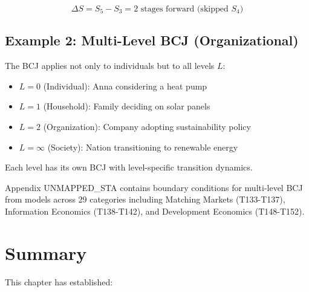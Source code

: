 \begin{equation}
\Delta S = S_5 - S_3 = 2 \text{ stages forward (skipped } S_4\text{)}
\label{eq:anna-transition}
\end{equation}

\subsection{Example 2: Multi-Level BCJ (Organizational)}

\begin{intuition}
The BCJ applies not only to individuals but to all levels $L$:
\begin{itemize}
    \item $L=0$ (Individual): Anna considering a heat pump
    \item $L=1$ (Household): Family deciding on solar panels
    \item $L=2$ (Organization): Company adopting sustainability policy
    \item $L=\infty$ (Society): Nation transitioning to renewable energy
\end{itemize}
Each level has its own BCJ with level-specific transition dynamics.
\end{intuition}

\begin{cross-reference}
Appendix UNMAPPED_STA contains boundary conditions for multi-level BCJ from
models across 29 categories including Matching Markets (T133-T137),
Information Economics (T138-T142), and Development Economics (T148-T152).
\end{cross-reference}



\section{Summary}
\label{sec:bcj-summary}


This chapter has established:

